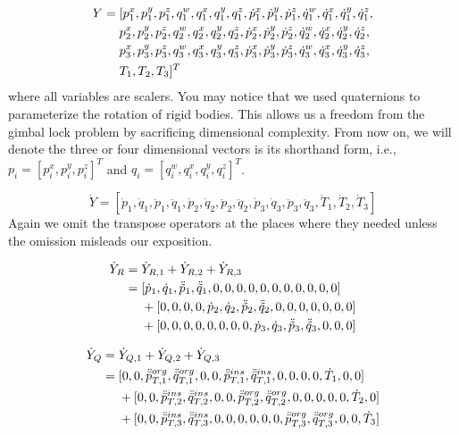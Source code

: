 \documentclass[a4paper,10pt]{article}
\begin{document}
\begin{align}
Y = {} & [p_1^x, p_1^y, p_1^z, q_1^w, q_1^x, q_1^y, q_1^z, \dot{p}_1^x, \dot{p}_1^y, \dot{p}_1^z, \dot{q}_1^w, \dot{q}_1^x, \dot{q}_1^y, \dot{q}_1^z,\notag\\
       &  p_2^x, p_2^y, p_2^z, q_2^w, q_2^x, q_2^y, q_2^z, \dot{p}_2^x, \dot{p}_2^y, \dot{p}_2^z, \dot{q}_2^w, \dot{q}_2^x, \dot{q}_2^y, \dot{q}_2^z,\notag\\
       &  p_3^x, p_3^y, p_3^z, q_3^w, q_3^x, q_3^y, q_3^z, \dot{p}_3^x, \dot{p}_3^y, \dot{p}_3^z, \dot{q}_3^w, \dot{q}_3^x, \dot{q}_3^y, \dot{q}_3^z,\notag\\
       & T_1, T_2, T_3]^T\label{StateVector}
\end{align}
where all variables are scalers. You may notice that we used quaternions
to parameterize the rotation of rigid bodies. This allows us a freedom
from the gimbal lock problem by sacrificing dimensional complexity. From
now on, we will denote the three or four dimensional vectors is its shorthand
form, i.e., $p_i=[p_i^x, p_i^y, p_i^z]^T$ and $q_i=[q_i^w, q_i^x, q_i^y, q_i^z]^T$.

\begin{equation}\label{StateVectorDerivative}
\dot{Y}  =  [\dot{p}_1, \dot{q}_1, \ddot{p}_1, \ddot{q}_1,
               \dot{p}_2, \dot{q}_2, \ddot{p}_2, \ddot{q}_2,
               \dot{p}_3, \dot{q}_3, \ddot{p}_3, \ddot{q}_3,
               \dot{T}_1, \dot{T}_2, \dot{T}_3]
\end{equation}
Again we omit the transpose operators at the places where they needed
unless the omission misleads our exposition.


\begin{align}
\dot{Y}_R = {} & \dot{Y}_{R,1} + \dot{Y}_{R,2} + \dot{Y}_{R,3}\\
          = {} &  [   \dot{p}_1, \dot{q}_1, \ddot{\tilde{p}}_1, \ddot{\tilde{q}}_1, 0, 0, 0, 0, 0, 0, 0, 0, 0, 0, 0 ]\notag\\
               & + [ 0, 0, 0, 0, \dot{p}_2, \dot{q}_2, \ddot{\tilde{p}}_2, \ddot{\tilde{q}}_2, 0, 0, 0, 0, 0, 0, 0 ]\notag\\
               & + [ 0, 0, 0, 0, 0, 0, 0, 0, \dot{p}_3, \dot{q}_3, \ddot{\tilde{p}}_3, \ddot{\tilde{q}}_3, 0, 0, 0 ]\notag
\end{align}


\begin{align}
\dot{Y}_Q = {} & \dot{Y}_{Q,1} + \dot{Y}_{Q,2} + \dot{Y}_{Q,3}\\
          = {} &   [ 0, 0, \ddot{\bar{p}}_{T,1}^{org}, \ddot{\bar{q}}_{T,1}^{org}, 0, 0, \ddot{\bar{p}}_{T,1}^{ins}, \ddot{\bar{q}}_{T,1}^{ins}, 0, 0, 0, 0, \dot{T}_1, 0, 0 ]\notag\\
               & + [ 0, 0, \ddot{\bar{p}}_{T,2}^{ins}, \ddot{\bar{q}}_{T,2}^{ins}, 0, 0, \ddot{\bar{p}}_{T,2}^{org}, \ddot{\bar{q}}_{T,2}^{org}, 0, 0, 0, 0, 0, \dot{T}_2, 0 ]\notag\\
               & + [ 0, 0, \ddot{\bar{p}}_{T,3}^{ins}, \ddot{\bar{q}}_{T,3}^{ins}, 0, 0, 0, 0, 0, 0, \ddot{\bar{p}}_{T,3}^{org}, \ddot{\bar{q}}_{T,3}^{org}, 0, 0, \dot{T}_3 ]\notag
\end{align}
\end{document}
